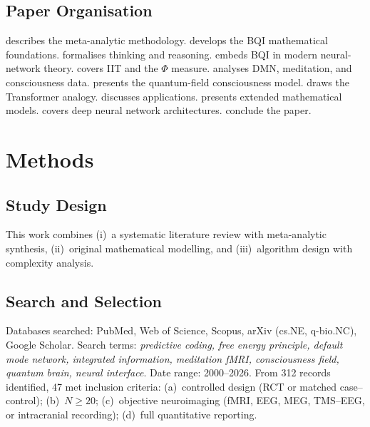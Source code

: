 \documentclass[12pt,a4paper]{article}
\theoremstyle{plain}
\theoremstyle{definition}
\theoremstyle{remark}
\newcommand{\vPhi}{\Phi}
\begin{document}
\subsection{Paper Organisation}

 describes the meta-analytic methodology.
 develops the BQI mathematical foundations.
 formalises thinking and reasoning.
 embeds BQI in modern neural-network theory.
 covers IIT and the $\vPhi$ measure.
 analyses DMN, meditation, and consciousness data.
 presents the quantum-field consciousness model.
 draws the Transformer analogy.
 discusses applications.
 presents extended mathematical models.
 covers deep neural network architectures.
 conclude the paper.

\section{Methods}
\label{sec:methods}

\subsection{Study Design}

This work combines (i)~a systematic literature review with meta-analytic synthesis, (ii)~original mathematical modelling, and (iii)~algorithm design with complexity analysis.

\subsection{Search and Selection}

Databases searched: PubMed, Web of Science, Scopus, arXiv (cs.NE, q-bio.NC),
Google Scholar. Search terms: \textit{predictive coding, free energy principle,
default mode network, integrated information, meditation fMRI, consciousness field, quantum brain, neural interface}. Date range: 2000--2026.
From 312 records identified, 47 met inclusion criteria:
(a)~controlled design (RCT or matched case--control);
(b)~$N \geq 20$;
(c)~objective neuroimaging (fMRI, EEG, MEG, TMS--EEG, or intracranial recording);
(d)~full quantitative reporting.
\end{document}
